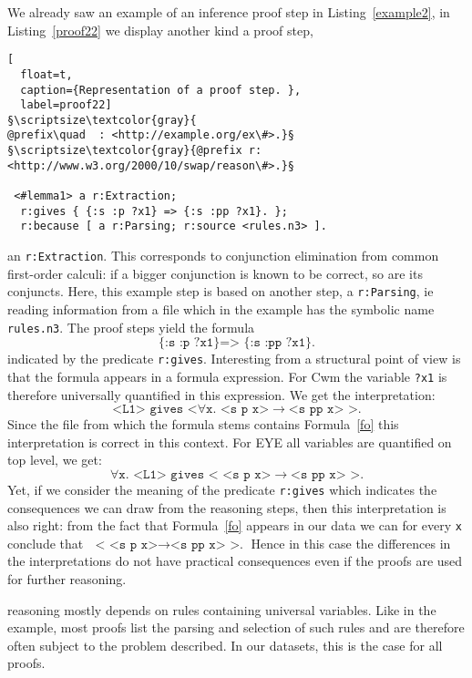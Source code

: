 We already saw an example
of an inference proof
step in Listing~\ref{example2}, in 
Listing~\ref{proof22} we display another kind a proof step,
\begin{lstlisting}[
  float=t,
  caption={Representation of a proof step. },
  label=proof22]
§\scriptsize\textcolor{gray}{
@prefix\quad  : <http://example.org/ex\#>.}§
§\scriptsize\textcolor{gray}{@prefix r: <http://www.w3.org/2000/10/swap/reason\#>.}§

 <#lemma1> a r:Extraction;
  r:gives { {:s :p ?x1} => {:s :pp ?x1}. };
  r:because [ a r:Parsing; r:source <rules.n3> ].
\end{lstlisting}
% 
an \texttt{r:Extraction}. This corresponds to conjunction elimination from common first-order calculi: 
if a bigger conjunction is known 
to be correct, so are its conjuncts. %
Here, this example step 
is based on another step, a \texttt{r:Parsing}, ie reading information from a file which in the example has the symbolic name \texttt{rules.n3}.
The proof steps yield the formula \begin{equation}\texttt{\{:s :p ?x1\} => \{:s :pp ?x1\}.}\label{fo}\end{equation} indicated by the predicate \texttt{r:gives}. 
Interesting from a structural point of view is  
that the formula appears in a formula expression.  For Cwm the variable \texttt{?x1} is therefore universally quantified in this expression. We get the interpretation:
\[
 \texttt{<L1> gives <}\forall \texttt{x. <s p x>}\rightarrow\texttt{<s pp x> >.}
\]
Since the file from which the formula stems contains Formula~\ref{fo} this interpretation is correct in this context. For 
EYE all variables are quantified on top level,  we get: %
\[
\forall \texttt{x. <L1> gives < <s p x>}\rightarrow\texttt{<s pp x> >.}
\]
Yet, if we consider the meaning of the predicate \texttt{r:gives} which indicates the consequences we can draw from the reasoning steps, then this interpretation is also right:
from the fact that Formula~\ref{fo} appears in our data we can for every \texttt{x} conclude that $\texttt{ < <s p x>}\rightarrow\texttt{<s pp x> >.}$ 
Hence in this case the differences 
in the interpretations do not have practical consequences even if the proofs are used for further reasoning.

\nthree reasoning mostly depends on rules containing universal variables. Like in the example, most proofs list the parsing and selection of such rules and 
are therefore often
subject to the problem described. In our datasets, this is the case for all proofs. 

